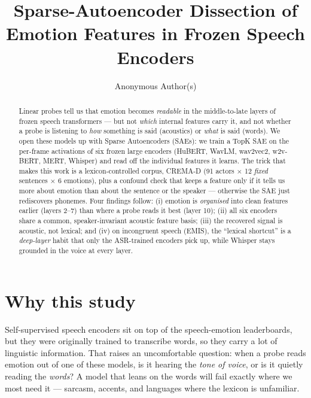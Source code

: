 \documentclass[sigconf,anonymous,nonacm]{acmart}
\begin{document}
\title{Sparse-Autoencoder Dissection of Emotion Features in Frozen Speech Encoders}
\author{Anonymous Author(s)}
\renewcommand{\shortauthors}{Anonymous}

\begin{abstract}
Linear probes tell us that emotion becomes \emph{readable} in the middle-to-late layers of frozen speech transformers --- but not \emph{which} internal features carry it, and not whether a probe is listening to \emph{how} something is said (acoustics) or \emph{what} is said (words). We open these models up with Sparse Autoencoders (SAEs): we train a TopK SAE on the per-frame activations of six frozen large encoders (HuBERT, WavLM, wav2vec2, w2v-BERT, MERT, Whisper) and read off the individual features it learns. The trick that makes this work is a lexicon-controlled corpus, CREMA-D (91 actors $\times$ 12 \emph{fixed} sentences $\times$ 6 emotions), plus a confound check that keeps a feature only if it tells us more about emotion than about the sentence or the speaker --- otherwise the SAE just rediscovers phonemes. Four findings follow: (i) emotion is \emph{organised} into clean features earlier (layers 2--7) than where a probe reads it best (layer 10); (ii) all six encoders share a common, speaker-invariant acoustic feature basis; (iii) the recovered signal is acoustic, not lexical; and (iv) on incongruent speech (EMIS), the ``lexical shortcut'' is a \emph{deep-layer} habit that only the ASR-trained encoders pick up, while Whisper stays grounded in the voice at every layer.
\end{abstract}
\maketitle

\section{Why this study}
Self-supervised speech encoders sit on top of the speech-emotion leaderboards, but they were originally trained to transcribe words, so they carry a lot of linguistic information. That raises an uncomfortable question: when a probe reads emotion out of one of these models, is it hearing the \emph{tone of voice}, or is it quietly reading the \emph{words}? A model that leans on the words will fail exactly where we most need it --- sarcasm, accents, and languages where the lexicon is unfamiliar.
\end{document}
